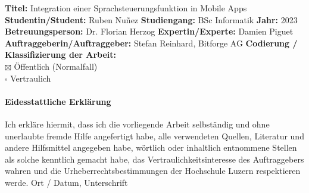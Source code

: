 \documentclass[main.tex]{subfiles} %
\begin{document}
\vspace*{0.6cm}

\noindent
\textbf{Titel:} Integration einer Sprachsteuerungsfunktion in Mobile Apps \newline \newline
\textbf{Studentin/Student:} Ruben Nuñez \newline \newline
\textbf{Studiengang:} BSc Informatik \newline \newline
\textbf{Jahr:} 2023 \newline \newline
\textbf{Betreuungsperson:} Dr. Florian Herzog \newline \newline
\textbf{Expertin/Experte:} Damien Piguet \newline \newline
\textbf{Auftraggeberin/Auftraggeber:} Stefan Reinhard, Bitforge AG \newline \newline
\textbf{Codierung / Klassifizierung der Arbeit:} \\
$\boxtimes$ Öffentlich (Normalfall) \\
$\square$ Vertraulich \\




\paragraph{\textbf{Eidesstattliche Erklärung}}
Ich erkläre hiermit, dass ich die vorliegende Arbeit selbständig und ohne unerlaubte fremde
Hilfe angefertigt habe, alle verwendeten Quellen, Literatur und andere Hilfsmittel angegeben
habe, wörtlich oder inhaltlich entnommene Stellen als solche kenntlich gemacht habe, das
Vertraulichkeitsinteresse des Auftraggebers wahren und die Urheberrechtsbestimmungen der
Hochschule Luzern respektieren werde.
\newline
\newline
Ort / Datum, Unterschrift	\underline{\hspace*{4cm}}
\newline
\newline
\end{document}
